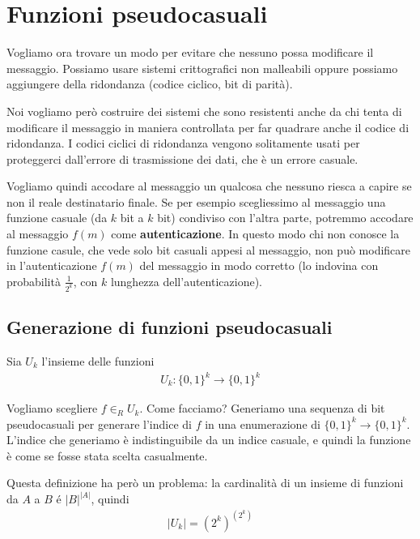 \setchapterpreamble[u]{\margintoc}
\chapter{Funzioni pseudocasuali}

Vogliamo ora trovare un modo per evitare che nessuno possa modificare il messaggio. Possiamo usare sistemi crittografici non malleabili oppure possiamo aggiungere della ridondanza (codice ciclico, bit di parità). 

Noi vogliamo però costruire dei sistemi che sono resistenti anche da chi tenta di modificare il messaggio in maniera controllata per far quadrare anche il codice di ridondanza. I codici ciclici di ridondanza vengono solitamente usati per proteggerci dall'errore di trasmissione dei dati, che è un errore casuale. 

Vogliamo quindi accodare al messaggio un qualcosa che nessuno riesca a capire se non il reale destinatario finale. Se per esempio scegliessimo al messaggio una funzione casuale (da $k$ bit a $k$ bit) condiviso con l'altra parte, potremmo accodare al messaggio $f(m)$ come \textbf{autenticazione}. In questo modo chi non conosce la funzione casule, che vede solo bit casuali appesi al messaggio, non può modificare in l'autenticazione $f(m)$ del messaggio in modo corretto (lo indovina con probabilità $\frac{1}{2^k}$, con $k$ lunghezza dell'autenticazione).

\section{Generazione di funzioni pseudocasuali}

Sia $U_k$ l'insieme delle funzioni 
\begin{align*}
    U_k: \{0, 1\}^k \rightarrow  \{0, 1\}^k
\end{align*}

\noindent Vogliamo scegliere $f \in_R U_k$. Come facciamo? Generiamo una sequenza di bit pseudocasuali per generare l'indice di $f$ in una enumerazione di $\{0, 1\}^k \rightarrow  \{0, 1\}^k$. L'indice che generiamo è indistinguibile da un indice casuale, e quindi la funzione è come se fosse stata scelta casualmente. 

Questa definizione ha però un problema: la cardinalità di un insieme di funzioni da $A$ a $B$ é $|B|^{|A|}$, quindi 
\begin{align*}
    |U_k| = (2^k)^{(2^k)}
\end{align*}

